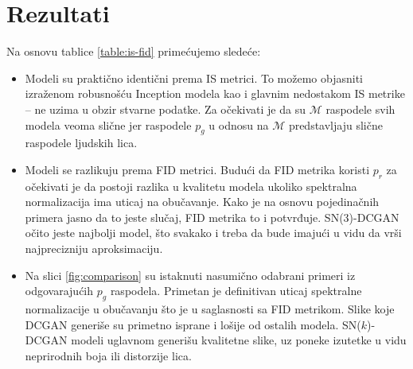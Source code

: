 \documentclass[12pt, a4paper]{article}
\begin{document}
\section{Rezultati}
Na osnovu tablice \ref{table:is-fid} primećujemo sledeće:
\begin{itemize}
	\item Modeli su praktično identični prema IS metrici. To možemo objasniti izraženom robusnošću Inception modela kao i glavnim nedostakom IS metrike -- ne uzima u obzir stvarne podatke. Za očekivati je da su $\mathcal{M}$ raspodele svih modela veoma slične jer raspodele $p_g$ u odnosu na $\mathcal{M}$ predstavljaju slične raspodele ljudskih lica.
	
	\item Modeli se razlikuju prema FID metrici. Budući da FID metrika koristi $p_r$ za očekivati je da postoji razlika u kvalitetu modela ukoliko spektralna normalizacija ima uticaj na obučavanje. Kako je na osnovu pojedinačnih primera jasno da to jeste slučaj, FID metrika to i potvrđuje. SN($3$)-DCGAN očito jeste najbolji model, što svakako i treba da bude imajući u vidu da vrši najprecizniju aproksimaciju.
	
	\item Na slici \ref{fig:comparison} su istaknuti nasumično odabrani primeri iz odgovarajućih $p_g$ raspodela. Primetan je definitivan uticaj spektralne normalizacije u obučavanju što je u saglasnosti sa  FID metrikom. Slike koje DCGAN generiše su primetno isprane i lošije od ostalih modela. SN($k$)-DCGAN modeli uglavnom generišu kvalitetne slike, uz poneke izutetke u vidu neprirodnih boja ili distorzije lica.
\end{itemize}
\end{document}
